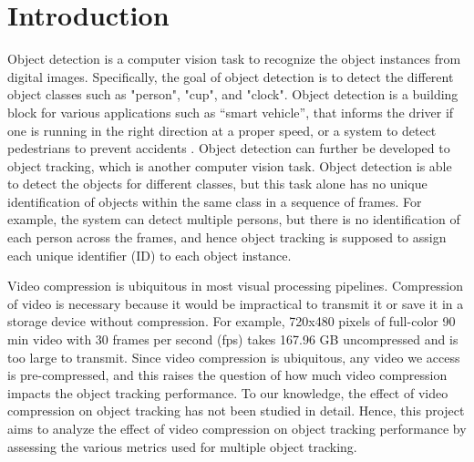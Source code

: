 \chapter{Introduction}
\label{chap:introduction}

Object detection is a computer vision task to recognize the object instances from digital images. Specifically, the goal of object detection is to detect the different object classes such as "person", "cup", and "clock". Object detection is a building block for various applications such as “smart vehicle”, that informs the driver if one is running in the right direction at a proper speed, or a system to detect pedestrians to prevent accidents \cite{gavrila_real-time_1999}. Object detection can further be developed to object tracking, which is another computer vision task. Object detection is able to detect the objects for different classes, but this task alone has no unique identification of objects within the same class in a sequence of frames. For example, the system can detect multiple persons, but there is no identification of each person across the frames, and hence object tracking is supposed to assign each unique identifier (ID) to each object instance.

Video compression is ubiquitous in most visual processing pipelines. Compression of video is necessary because it would be impractical to transmit it or save it in a storage device without compression. For example, 720x480 pixels of full-color 90 min video with 30 frames per second (fps) takes 167.96 GB uncompressed and is too large to transmit. Since video compression is ubiquitous, any video we access is pre-compressed, and this raises the question of how much video compression impacts the object tracking performance. To our knowledge, the effect of video compression on object tracking has not been studied in detail. Hence, this project aims to analyze the effect of video compression on object tracking performance by assessing the various metrics used for multiple object tracking.







